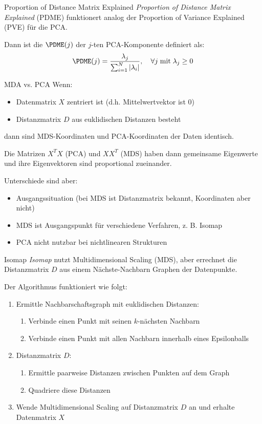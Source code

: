 \begin{defi}{Proportion of Distance Matrix Explained}
    \emph{Proportion of Distance Matrix Explained} (PDME) funktionert analog der Proportion of Variance Explained (PVE) für die PCA.

    Dann ist die $\PDME(j)$ der $j$-ten PCA-Komponente definiert als:
    \[
        \PDME(j) = \frac{\lambda_j}{\sum_{i=1}^{N} |\lambda_i|}, \quad \forall j \; \text{mit} \; \lambda_j \geq 0
    \]
\end{defi}

\begin{bonus}{MDA vs. PCA}
    Wenn:
    \begin{itemize}
        \item Datenmatrix $X$ zentriert ist (d.h. Mittelwertvektor ist 0)
        \item Distanzmatrix $D$ aus euklidischen Distanzen besteht
    \end{itemize}
    dann sind MDS-Koordinaten und PCA-Koordinaten der Daten identisch.

    Die Matrizen $X^TX$ (PCA) und $XX^T$ (MDS) haben dann gemeinsame Eigenwerte und ihre Eigenvektoren sind proportional zueinander.

    Unterschiede sind aber:
    \begin{itemize}
        \item Ausgangssituation (bei MDS ist Distanzmatrix bekannt, Koordinaten aber nicht)
        \item MDS ist Ausgangspunkt für verschiedene Verfahren, z. B. Isomap
        \item PCA nicht nutzbar bei nichtlinearen Strukturen
    \end{itemize}
\end{bonus}

\begin{defi}{Isomap}
    \emph{Isomap} nutzt Multidimensional Scaling (MDS), aber errechnet die Distanzmatrix $D$ aus einem Nächste-Nachbarn Graphen der Datenpunkte.

    Der Algorithmus funktioniert wie folgt:
    \begin{enumerate}
        \item Ermittle Nachbarschaftsgraph mit euklidischen Distanzen:
              \begin{enumerate}
                  \item Verbinde einen Punkt mit seinen $k$-nächsten Nachbarn
                  \item Verbinde einen Punkt mit allen Nachbarn innerhalb eines Epsilonballs
              \end{enumerate}
        \item Distanzmatrix $D$:
              \begin{enumerate}
                  \item Ermittle paarweise Distanzen zwischen Punkten auf dem Graph
                  \item Quadriere diese Distanzen
              \end{enumerate}
        \item Wende Multidimensional Scaling auf Distanzmatrix $D$ an und erhalte Datenmatrix $X$
    \end{enumerate}
\end{defi}